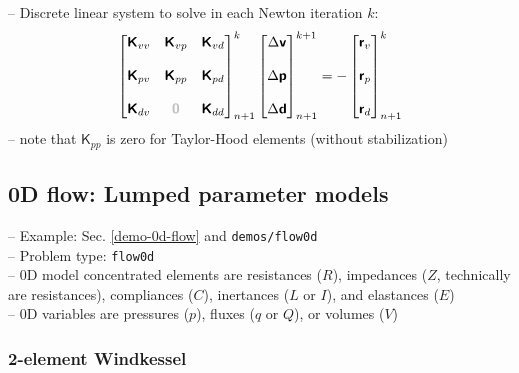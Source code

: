 \documentclass[a4paper,12pt]{report}
\newcommand{\bs}[1]{\boldsymbol{#1}}
\newcommand{\zerom}{\textcolor{lightgray}{\bs{\mathsf{0}}}}
\newcommand{\ROP}{\bs{\mathsf{r}}}
\begin{document}
-- Discrete linear system to solve in each Newton iteration $k$:
\begin{equation}
\label{equation-lin-sys-fluid-ale}
\begin{aligned}
\begin{bmatrix} \bs{\mathsf{K}}_{vv} & \bs{\mathsf{K}}_{vp} & \bs{\mathsf{K}}_{vd} \\ \\ \bs{\mathsf{K}}_{pv} & \bs{\mathsf{K}}_{pp} & \bs{\mathsf{K}}_{pd} \\ \\ \bs{\mathsf{K}}_{dv}  & \zerom & \bs{\mathsf{K}}_{dd} \end{bmatrix}_{n+1}^{k}\begin{bmatrix} \Delta\bs{\mathsf{v}} \\ \\ \Delta\bs{\mathsf{p}} \\ \\ \Delta\bs{\mathsf{d}} \end{bmatrix}_{n+1}^{k+1}=-\begin{bmatrix} \ROP_{v} \\ \\ \ROP_{p} \\ \\ \ROP_{d} \end{bmatrix}_{n+1}^{k} 
\end{aligned}
\end{equation}
-- note that $\bs{\mathsf{K}}_{pp}$ is zero for Taylor-Hood elements (without stabilization)


\subsection{0D flow: Lumped parameter models}\label{d-flow-lumped-parameter-models}

-- Example: Sec. \ref{demo-0d-flow} and \verb"demos/flow0d"\\

-- Problem type: \verb"flow0d"\\

-- 0D model concentrated elements are resistances ($R$), impedances ($Z$, technically are resistances), compliances ($C$), inertances ($L$ or $I$), and elastances ($E$)\\

-- 0D variables are pressures ($p$), fluxes ($q$ or $Q$), or volumes ($V$)

\subsubsection{2-element Windkessel}
\end{document}
